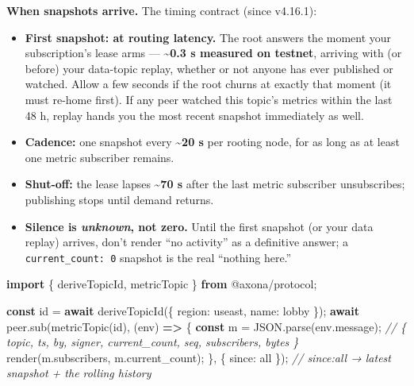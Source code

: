\documentclass[
  nobib]{tufte-handout}
\newenvironment{Shaded}{}{}
\newcommand{\AttributeTok}[1]{\textcolor[rgb]{0.49,0.56,0.16}{#1}}
\newcommand{\BuiltInTok}[1]{\textcolor[rgb]{0.00,0.50,0.00}{#1}}
\newcommand{\CommentTok}[1]{\textcolor[rgb]{0.38,0.63,0.69}{\textit{#1}}}
\newcommand{\ControlFlowTok}[1]{\textcolor[rgb]{0.00,0.44,0.13}{\textbf{#1}}}
\newcommand{\DataTypeTok}[1]{\textcolor[rgb]{0.56,0.13,0.00}{#1}}
\newcommand{\FunctionTok}[1]{\textcolor[rgb]{0.02,0.16,0.49}{#1}}
\newcommand{\ImportTok}[1]{\textcolor[rgb]{0.00,0.50,0.00}{\textbf{#1}}}
\newcommand{\KeywordTok}[1]{\textcolor[rgb]{0.00,0.44,0.13}{\textbf{#1}}}
\newcommand{\NormalTok}[1]{#1}
\newcommand{\OperatorTok}[1]{\textcolor[rgb]{0.40,0.40,0.40}{#1}}
\newcommand{\StringTok}[1]{\textcolor[rgb]{0.25,0.44,0.63}{#1}}
\providecommand{\tightlist}{%
  \setlength{\itemsep}{0pt}\setlength{\parskip}{0pt}}
\begin{document}
\textbf{When snapshots arrive.} The timing contract (since v4.16.1):

\begin{itemize}
\tightlist
\item
  \textbf{First snapshot: at routing latency.} The root answers the
  moment your subscription's lease arms --- \textbf{\textasciitilde0.3 s
  measured on testnet}, arriving with (or before) your data-topic
  replay, whether or not anyone has ever published or watched. Allow a
  few seconds if the root churns at exactly that moment (it must re-home
  first). If any peer watched this topic's metrics within the last 48 h,
  replay hands you the most recent snapshot immediately as well.
\item
  \textbf{Cadence:} one snapshot every \textbf{\textasciitilde20 s} per
  rooting node, for as long as at least one metric subscriber remains.
\item
  \textbf{Shut-off:} the lease lapses \textbf{\textasciitilde70 s} after
  the last metric subscriber unsubscribes; publishing stops until demand
  returns.
\item
  \textbf{Silence is \emph{unknown}, not zero.} Until the first snapshot
  (or your data replay) arrives, don't render ``no activity'' as a
  definitive answer; a \texttt{current\_count:\ 0} snapshot is the real
  ``nothing here.''
\end{itemize}

\begin{Shaded}
\begin{Highlighting}[]
\ImportTok{import}\NormalTok{ \{ deriveTopicId}\OperatorTok{,}\NormalTok{ metricTopic \} }\ImportTok{from} \StringTok{\textquotesingle{}@axona/protocol\textquotesingle{}}\OperatorTok{;}

\KeywordTok{const}\NormalTok{ id }\OperatorTok{=} \ControlFlowTok{await} \FunctionTok{deriveTopicId}\NormalTok{(\{ }\DataTypeTok{region}\OperatorTok{:} \StringTok{\textquotesingle{}useast\textquotesingle{}}\OperatorTok{,} \DataTypeTok{name}\OperatorTok{:} \StringTok{\textquotesingle{}lobby\textquotesingle{}}\NormalTok{ \})}\OperatorTok{;}
\ControlFlowTok{await}\NormalTok{ peer}\OperatorTok{.}\FunctionTok{sub}\NormalTok{(}\FunctionTok{metricTopic}\NormalTok{(id)}\OperatorTok{,}\NormalTok{ (env) }\KeywordTok{=\textgreater{}}\NormalTok{ \{}
  \KeywordTok{const}\NormalTok{ m }\OperatorTok{=} \BuiltInTok{JSON}\OperatorTok{.}\FunctionTok{parse}\NormalTok{(env}\OperatorTok{.}\AttributeTok{message}\NormalTok{)}\OperatorTok{;}
  \CommentTok{// \{ topic, ts, by, signer, current\_count, seq, subscribers, bytes \}}
  \FunctionTok{render}\NormalTok{(m}\OperatorTok{.}\AttributeTok{subscribers}\OperatorTok{,}\NormalTok{ m}\OperatorTok{.}\AttributeTok{current\_count}\NormalTok{)}\OperatorTok{;}
\NormalTok{\}}\OperatorTok{,}\NormalTok{ \{ }\DataTypeTok{since}\OperatorTok{:} \StringTok{\textquotesingle{}all\textquotesingle{}}\NormalTok{ \})}\OperatorTok{;}   \CommentTok{// since:\textquotesingle{}all\textquotesingle{} → latest snapshot + the rolling history}
\end{Highlighting}
\end{Shaded}
\end{document}
